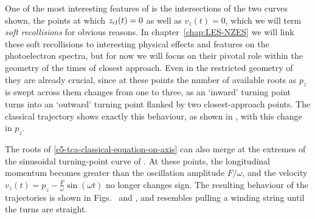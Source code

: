 One of the most interesting features of  is the intersections of the two curves shown, the points at which $z_{\mathrm{cl}}(t)=0$ as well as $v_z(t)=0$, which we will term \textit{soft recollisions} for obvious reasons. In chapter~\ref{chap:LES-NZES} we will link these soft recollisions to interesting physical effects and features on the photoelectron spectra, but for now we will focus on their pivotal role within the geometry of the times of closest approach. Even in the restricted geometry of  they are already crucial, since at these points the number of available roots as $p_z$ is swept across them changes from one to three, as an `inward' turning point turns into an `outward' turning point flanked by two closest-approach points. The classical trajectory shows exactly this behaviour, as shown in , with this change in $p_z$.

The roots of \eqref{e5-tca-classical-equation-on-axis} can also merge at the extremes of the sinusoidal turning-point curve of . At these points, the longitudinal momentum becomes greater than the oscillation amplitude $F/\omega$, and the velocity $v_z(t)=p_z - \frac{F}{\omega}\sin(\omega t)$ no longer changes sign. The resulting behaviour of the trajectories is shown in Figs.~ and , and resembles pulling a winding string until the turns are straight.


